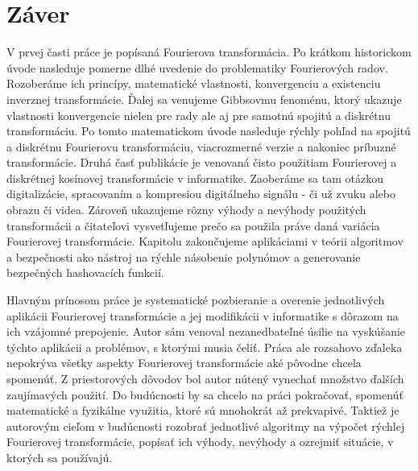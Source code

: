 \chapter{Záver}

V prvej časti práce je popísaná Fourierova transformácia. Po krátkom
historickom úvode nasleduje pomerne dlhé uvedenie do problematiky
Fourierových radov. Rozoberáme ich princípy, matematické vlastnosti,
konvergenciu a existenciu inverznej transformácie. Ďalej sa venujeme
Gibbsovmu fenoménu, ktorý ukazuje vlastnosti konvergencie nielen pre
rady ale aj pre samotnú spojitú a diskrétnu transformáciu. Po tomto
matematickom úvode nasleduje rýchly pohľad na spojitú a diskrétnu
Fourierovu transformáciu, viacrozmerné verzie a nakoniec príbuzné
transformácie.
Druhá časť publikácie je venovaná čisto použitiam Fourierovej a
diskrétnej kosínovej transformácie v informatike. Zaoberáme sa tam
otázkou digitalizácie, spracovaním a kompresiou digitálneho signálu -
či už zvuku alebo obrazu či videa. Zároveň ukazujeme rôzny výhody a
nevýhody použitých transformácii a čitateľovi vysvetľujeme prečo sa
použila práve daná variácia Fourierovej transformácie. Kapitolu
zakončujeme aplikáciami v teórii algoritmov a bezpečnosti ako nástroj
na rýchle násobenie polynómov a generovanie bezpečných hashovacích
funkcií.

Hlavným prínosom práce je systematické pozbieranie a overenie jednotlivých
aplikácii Fourierovej transformácie a jej modifikácii v informatike s
dôrazom na ich vzájomné prepojenie. Autor sám venoval nezanedbateľné
úsilie na vyskúšanie týchto aplikácii a problémov, s ktorými musia
čeliť. Práca ale rozsahovo zďaleka
nepokrýva všetky aspekty Fourierovej transformácie aké pôvodne chcela
spomenúť. Z priestorových dôvodov bol autor nútený
vynechať množstvo ďalších zaujímavých použití. Do budúcnosti by sa
chcelo na práci pokračovať, spomenúť matematické a fyzikálne využitia,
ktoré sú mnohokrát až prekvapivé. Taktiež je autorovým cieľom v
budúcnosti rozobrať jednotlivé algoritmy na výpočet rýchlej Fourierovej transformácie,
popísať ich výhody, nevýhody a ozrejmiť situácie, v ktorých sa
používajú.
